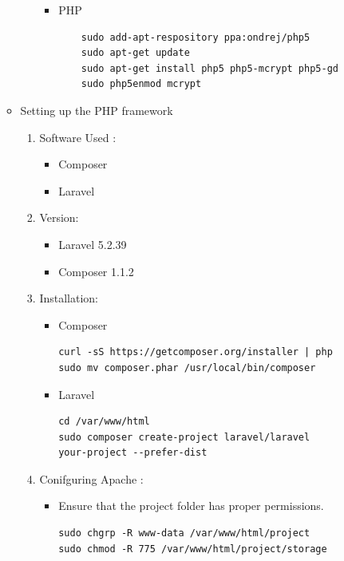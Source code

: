 \documentclass[a4paper,12pt,oneside]{book}
\begin{document}
\begin{enumerate}
\begin{itemize}
\begin{enumerate}
\begin{itemize}
							\item PHP 
							\begin{verbatim}
    sudo add-apt-respository ppa:ondrej/php5
    sudo apt-get update
    sudo apt-get install php5 php5-mcrypt php5-gd
    sudo php5enmod mcrypt
							\end{verbatim}
						\end{itemize}
  				\end{enumerate}
  			\item  Setting up the PHP framework
  				\begin{enumerate}
  					\item Software Used :
  						\begin{itemize}
  							\item Composer 
  							\item Laravel
  						\end{itemize}
  					\item Version:
  						\begin{itemize}
  							\item Laravel 5.2.39
  							\item Composer 1.1.2
  						\end{itemize}
  							
  					\item Installation:
  						\begin{itemize}
  							\item Composer 
      							\begin{verbatim}
curl -sS https://getcomposer.org/installer | php
sudo mv composer.phar /usr/local/bin/composer
      							\end{verbatim}
  							\item Laravel 
  							    \begin{verbatim}
cd /var/www/html
sudo composer create-project laravel/laravel 
your-project --prefer-dist
  							    \end{verbatim}
  						\end{itemize}
  					\item Conifguring Apache :
  						\begin{itemize}
  							\item Ensure that the project folder has proper permissions. 
  							    \begin{verbatim}
sudo chgrp -R www-data /var/www/html/project
sudo chmod -R 775 /var/www/html/project/storage
  							    \end{verbatim}
  						

\end{itemize}
\end{enumerate}
\end{itemize}
\end{enumerate}
\end{document}
